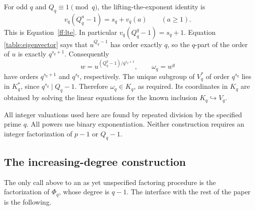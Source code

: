 For odd $q$ and $Q_q\equiv1\pmod q$, the lifting-the-exponent identity is
\begin{equation}\label{table:lte}
 v_q(Q_q^a-1)=s_q+v_q(a)\qquad(a\ge1).
\end{equation}
This is Equation~\eqref{ff:lte}.  In particular $v_q(Q_q^q-1)=s_q+1$.  Equation
\eqref{table:eigenvector} says that $u^{Q_q-1}$ has order exactly $q$,
so the $q$-part of the order of $u$ is exactly $q^{s_q+1}$.  Consequently
\[
 w=u^{(Q_q^q-1)/q^{s_q+1}},\qquad \omega_q=w^q
\]
have orders $q^{s_q+1}$ and $q^{s_q}$, respectively.  The unique
subgroup of $V_q^*$ of order $q^{s_q}$ lies in $K_q^*$, since
$q^{s_q}\mid Q_q-1$.  Therefore $\omega_q\in K_q$, as required.
Its coordinates in $K_q$ are obtained by solving the linear equations for
the known inclusion $K_q\hookrightarrow V_q$.

All integer valuations used here are found by repeated division by the
specified prime $q$.  All powers use binary exponentiation.  Neither
construction requires an integer factorization of $p-1$ or $Q_q-1$.

\subsection{The increasing-degree construction}

The only call above to an as yet unspecified factoring procedure is the
factorization of $\Phi_q$, whose degree is $q-1$.  The interface with the
rest of the paper is the following.

